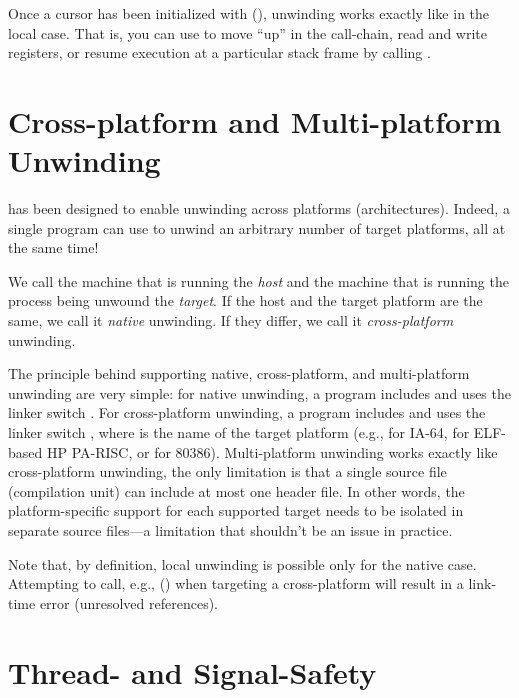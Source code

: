\documentclass{article}
\begin{document}
Once a cursor has been initialized with (),
unwinding works exactly like in the local case.  That is, you can use
 to move ``up'' in the call-chain, read and write
registers, or resume execution at a particular stack frame by calling
.


\section{Cross-platform and Multi-platform Unwinding}

 has been designed to enable unwinding across
platforms (architectures).  Indeed, a single program can use
 to unwind an arbitrary number of target platforms,
all at the same time!

We call the machine that is running  the \emph{host}
and the machine that is running the process being unwound the
\emph{target}.  If the host and the target platform are the same, we
call it \emph{native} unwinding.  If they differ, we call it
\emph{cross-platform} unwinding.

The principle behind supporting native, cross-platform, and
multi-platform unwinding are very simple: for native unwinding, a
program includes  and uses the linker switch
.  For cross-platform unwinding, a program
includes  and uses the linker
switch , where  is the name
of the target platform (e.g.,  for IA-64, 
for ELF-based HP PA-RISC, or  for 80386).  Multi-platform
unwinding works exactly like cross-platform unwinding, the only
limitation is that a single source file (compilation unit) can include
at most one  header file.  In other words, the
platform-specific support for each supported target needs to be
isolated in separate source files---a limitation that shouldn't be an
issue in practice.

Note that, by definition, local unwinding is possible only for the
native case.  Attempting to call, e.g., () when
targeting a cross-platform will result in a link-time error
(unresolved references).


\section{Thread- and Signal-Safety}
\end{document}
